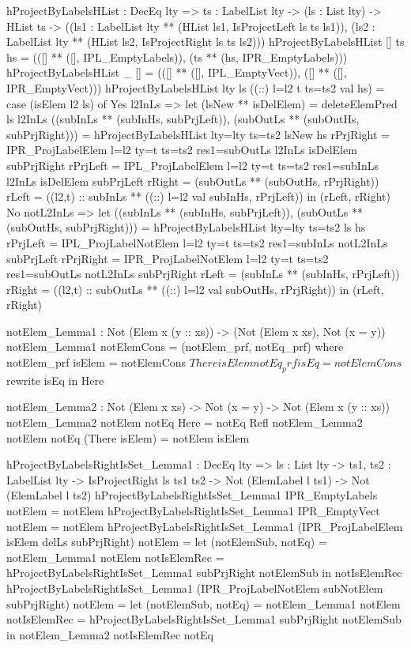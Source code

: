 \begin{code}
hProjectByLabelsHList : DecEq lty => {ts : LabelList lty} -> 
  (ls : List lty) -> HList ts ->     
  ((ls1 : LabelList lty ** (HList ls1, IsProjectLeft ls ts ls1)),
  (ls2 : LabelList lty ** (HList ls2, IsProjectRight ls ts ls2)))
hProjectByLabelsHList [] {ts} hs = 
                   (([] ** ([], IPL_EmptyLabels)),
                   (ts ** (hs, IPR_EmptyLabels)))
hProjectByLabelsHList _ [] =
                   (([] ** ([], IPL_EmptyVect)),
                   ([] ** ([], IPR_EmptyVect)))
hProjectByLabelsHList {lty} ls ((::) {l=l2} {t} {ts=ts2} val hs) =
  case (isElem l2 ls) of
    Yes l2InLs =>
      let
        (lsNew ** isDelElem) = deleteElemPred ls l2InLs
        ((subInLs ** (subInHs, subPrjLeft)), 
          (subOutLs ** (subOutHs, subPrjRight))) =
          hProjectByLabelsHList {lty=lty} {ts=ts2} lsNew hs
        rPrjRight = IPR_ProjLabelElem {l=l2} {ty=t} {ts=ts2} 
          {res1=subOutLs} l2InLs isDelElem subPrjRight
        rPrjLeft = IPL_ProjLabelElem {l=l2} {ty=t} {ts=ts2} 
          {res1=subInLs} l2InLs isDelElem subPrjLeft
        rRight = (subOutLs ** (subOutHs, rPrjRight))
        rLeft = ((l2,t) :: subInLs ** 
          ((::) {l=l2} val subInHs, rPrjLeft))
       in
         (rLeft, rRight)
    No notL2InLs =>
      let
        ((subInLs ** (subInHs, subPrjLeft)), 
          (subOutLs ** (subOutHs, subPrjRight))) =
          hProjectByLabelsHList {lty=lty} {ts=ts2} ls hs
        rPrjLeft = IPL_ProjLabelNotElem {l=l2} {ty=t} {ts=ts2} 
          {res1=subInLs} notL2InLs subPrjLeft
        rPrjRight = IPR_ProjLabelNotElem {l=l2} {ty=t} {ts=ts2} 
          {res1=subOutLs} notL2InLs subPrjRight
        rLeft = (subInLs ** (subInHs, rPrjLeft))
        rRight = ((l2,t) :: subOutLs ** 
          ((::) {l=l2} val subOutHs, rPrjRight))
      in
        (rLeft, rRight)
    
notElem_Lemma1 : Not (Elem x (y :: xs)) -> 
  (Not (Elem x xs), Not (x = y))
notElem_Lemma1 notElemCons = (notElem_prf, notEq_prf)
  where
    notElem_prf isElem = notElemCons $ There isElem
    notEq_prf isEq = notElemCons $ rewrite isEq in Here
    
notElem_Lemma2 : Not (Elem x xs) -> Not (x = y) -> 
  Not (Elem x (y :: xs))
notElem_Lemma2 notElem notEq Here = notEq Refl
notElem_Lemma2 notElem notEq (There isElem) = notElem isElem 
    
hProjectByLabelsRightIsSet_Lemma1 : DecEq lty => {ls : List lty} -> 
  {ts1, ts2 : LabelList lty} -> IsProjectRight ls ts1 ts2 -> 
  Not (ElemLabel l ts1) -> Not (ElemLabel l ts2)
hProjectByLabelsRightIsSet_Lemma1 IPR_EmptyLabels notElem = notElem
hProjectByLabelsRightIsSet_Lemma1 IPR_EmptyVect notElem = notElem
hProjectByLabelsRightIsSet_Lemma1 (IPR_ProjLabelElem isElem 
    delLs subPrjRight) notElem = 
  let
    (notElemSub, notEq) = notElem_Lemma1 notElem
    notIsElemRec = 
      hProjectByLabelsRightIsSet_Lemma1 subPrjRight notElemSub
  in notIsElemRec
hProjectByLabelsRightIsSet_Lemma1 (IPR_ProjLabelNotElem subNotElem 
    subPrjRight) notElem = 
  let
    (notElemSub, notEq) = notElem_Lemma1 notElem
    notIsElemRec = 
      hProjectByLabelsRightIsSet_Lemma1 subPrjRight notElemSub
  in notElem_Lemma2 notIsElemRec notEq
    

\end{code}
